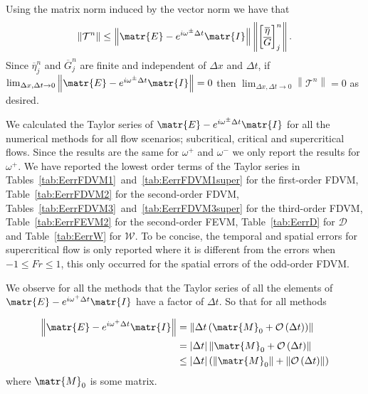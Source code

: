 Using the matrix norm induced by the vector norm we have that
\begin{equation}
\left \|\mathcal{T}^n \right \|  \le \left \| \matr{E} -  e^{i \omega^\pm \Delta t}\matr{I} \right \| \left \| \begin{bmatrix}
\overline{\eta} \\ \overline{G}
\end{bmatrix}^{n}_j\right \|.
\end{equation}
Since $\overline{\eta}^n_j$ and  $\overline{G}^n_j$ are finite and independent of $\Delta x$ and $\Delta t$, if $ \lim_{\Delta x,\Delta t \rightarrow 0}\left \| \matr{E} -  e^{i \omega^\pm \Delta t}\matr{I} \right \| = 0 $ then $ \lim_{\Delta x,\Delta t \rightarrow 0}\left \| \mathcal{T}^n \right \| = 0 $ as desired.

We calculated the Taylor series of $\matr{E} -  e^{i \omega^\pm \Delta t}\matr{I}$ for all the numerical methods for all flow scenarios; subcritical, critical and supercritical flows. Since the results are the same for $\omega^+$ and $\omega^-$ we only report the results for $\omega^+$. We have reported the lowest order terms of the Taylor series in Tables~\ref{tab:EerrFDVM1}~and~\ref{tab:EerrFDVM1super} for the first-order FDVM, Table~\ref{tab:EerrFDVM2} for the second-order FDVM, Tables~\ref{tab:EerrFDVM3}~and~\ref{tab:EerrFDVM3super} for the third-order FDVM,  Table~\ref{tab:EerrFEVM2} for the second-order FEVM, Table~\ref{tab:EerrD} for $\mathcal{D}$ and Table~\ref{tab:EerrW} for $\mathcal{W}$. To be concise, the temporal and spatial errors for supercritical flow is only reported where it is different from the errors when $-1 \le Fr \le 1$, this only occurred for the spatial errors of the odd-order FDVM. 

We observe for all the methods that the Taylor series of all the elements of $\matr{E} -  e^{i \omega^+ \Delta t}\matr{I}$ have a factor of $\Delta t$. So that for all methods 

\begin{align*}
\left \| \matr{E} -  e^{i \omega^+ \Delta t}\matr{I} \right \| &=  \left \| \Delta t \left(\matr{M}_0 +  \mathcal{O}\left(\Delta t\right)\right)\right \|  \nonumber\\ &= |\Delta t|  \left \| \matr{M}_0 +  \mathcal{O}\left(\Delta t\right)\right \|
 \nonumber\\ &\le  |\Delta t| \left(\left \| \matr{M}_0 \right \| + \left \| \mathcal{O}\left(\Delta t\right)\right \|\right)
\end{align*} 
where $\matr{M}_0$ is some matrix.

